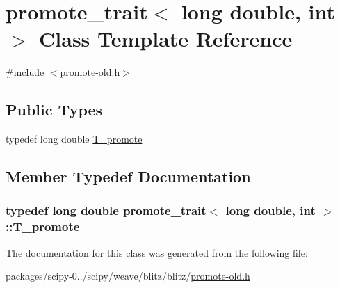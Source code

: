 \hypertarget{classpromote__trait_3_01long_01double_00_01int_01_4}{}\section{promote\+\_\+trait$<$ long double, int $>$ Class Template Reference}
\label{classpromote__trait_3_01long_01double_00_01int_01_4}


{\ttfamily \#include $<$promote-\/old.\+h$>$}

\subsection*{Public Types}
\begin{DoxyCompactItemize}
\item 
typedef long double \hyperlink{classpromote__trait_3_01long_01double_00_01int_01_4_aa691e03ea619b157333ce9c825994cdb}{T\+\_\+promote}
\end{DoxyCompactItemize}


\subsection{Member Typedef Documentation}
\hypertarget{classpromote__trait_3_01long_01double_00_01int_01_4_aa691e03ea619b157333ce9c825994cdb}{}
\subsubsection[{T\+\_\+promote}]{\setlength{\rightskip}{0pt plus 5cm}typedef long double {\bf promote\+\_\+trait}$<$ long double, int $>$\+::{\bf T\+\_\+promote}}\label{classpromote__trait_3_01long_01double_00_01int_01_4_aa691e03ea619b157333ce9c825994cdb}


The documentation for this class was generated from the following file\+:\begin{DoxyCompactItemize}
\item 
packages/scipy-\/0../scipy/weave/blitz/blitz/\hyperlink{promote-old_8h}{promote-\/old.\+h}\end{DoxyCompactItemize}
